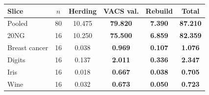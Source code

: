 \begin{tabular}{lccccc}
\toprule
Slice & $n$ & Herding & VACS val. & Rebuild & Total \\
\midrule
Pooled & 80 & 10.475 & \textbf{79.820} & \textbf{7.390} & \textbf{87.210} \\
20NG & 16 & 10.250 & \textbf{75.500} & \textbf{6.859} & \textbf{82.359} \\
Breast cancer & 16 & 0.038 & \textbf{0.969} & \textbf{0.107} & \textbf{1.076} \\
Digits & 16 & 0.137 & \textbf{2.011} & \textbf{0.336} & \textbf{2.347} \\
Iris & 16 & 0.018 & \textbf{0.667} & \textbf{0.038} & \textbf{0.705} \\
Wine & 16 & 0.032 & \textbf{0.673} & \textbf{0.050} & \textbf{0.723} \\
\bottomrule
\end{tabular}
